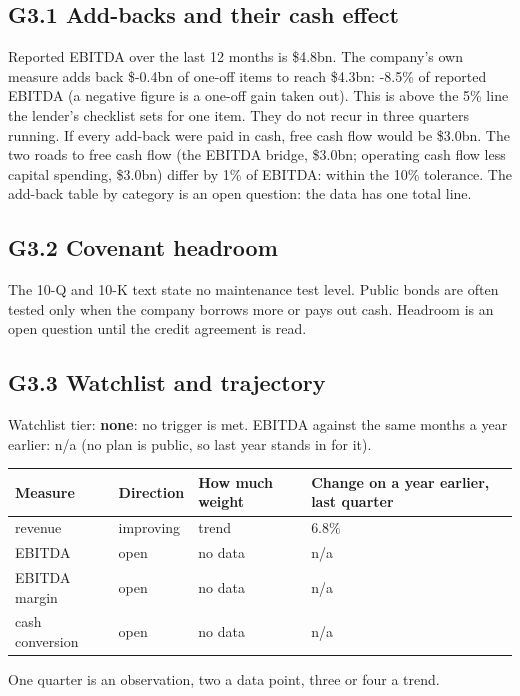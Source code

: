 \documentclass[11pt,a4paper]{article}
\begin{document}
\subsection*{G3.1 Add-backs and their cash effect}
Reported EBITDA over the last 12 months is \$4.8bn. The company's own measure adds back \$-0.4bn of one-off items to reach \$4.3bn: -8.5\% of reported EBITDA (a negative figure is a one-off gain taken out). This is above the 5\% line the lender's checklist sets for one item. They do not recur in three quarters running. If every add-back were paid in cash, free cash flow would be \$3.0bn. The two roads to free cash flow (the EBITDA bridge, \$3.0bn; operating cash flow less capital spending, \$3.0bn) differ by 1\% of EBITDA: within the 10\% tolerance. The add-back table by category is an open question: the data has one total line.
\subsection*{G3.2 Covenant headroom}
The 10-Q and 10-K text state no maintenance test level. Public bonds are often tested only when the company borrows more or pays out cash. Headroom is an open question until the credit agreement is read.
\subsection*{G3.3 Watchlist and trajectory}
Watchlist tier: \textbf{none}: no trigger is met. EBITDA against the same months a year earlier: n/a (no plan is public, so last year stands in for it).
\begin{center}\footnotesize\setlength{\tabcolsep}{3.5pt}\begin{tabular}{@{}llll@{}}\toprule
Measure & Direction & How much weight & Change on a year earlier, last quarter \\\midrule
revenue & improving & trend & 6.8\% \\
EBITDA & open & no data & n/a \\
EBITDA margin & open & no data & n/a \\
cash conversion & open & no data & n/a \\
\bottomrule\end{tabular}\end{center}
One quarter is an observation, two a data point, three or four a trend.
\end{document}
